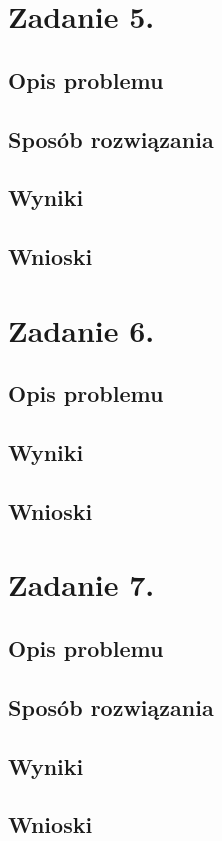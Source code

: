 \documentclass[12pt]{article}
\begin{document}
\section{Zadanie 5.}

\subsection{Opis problemu}

\subsection{Sposób rozwiązania}

\subsection{Wyniki}

\subsection{Wnioski}

\section{Zadanie 6.}

\subsection{Opis problemu}

\subsection{Wyniki}

\subsection{Wnioski}

\section{Zadanie 7.}

\subsection{Opis problemu}

\subsection{Sposób rozwiązania}

\subsection{Wyniki}

\subsection{Wnioski}
\end{document}
